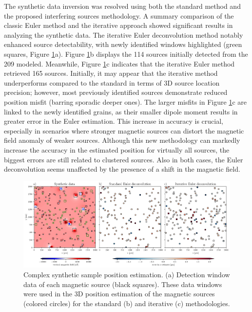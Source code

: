 The synthetic data inversion was resolved using both the standard method \citep{Souza-Junior2024} and the proposed interfering sources methodology. A summary comparison of the classic Euler method and the iterative approach showed significant results in analyzing the synthetic data. The iterative Euler deconvolution method notably enhanced source detectability, with newly identified windows highlighted (green squares, Figure \ref{euler2}a). Figure \ref{euler2}b displays the 114 sources initially detected from the 209 modeled. Meanwhile, Figure \ref{euler2}c indicates that the iterative Euler method retrieved 165 sources. Initially, it may appear that the iterative method underperforms compared to the standard in terms of 3D source location precision; however, most previously identified sources demonstrate reduced position misfit (barring sporadic deeper ones). The larger misfits in Figure \ref{euler2}c are linked to the newly identified grains, as their smaller dipole moment results in greater error in the Euler estimation. This increase in accuracy is crucial, especially in scenarios where stronger magnetic sources can distort the magnetic field anomaly of weaker sources. Although this new methodology can markedly increase the accuracy in the estimated position for virtually all sources, the biggest errors are still related to clustered sources. Also in both cases, the Euler deconvolution seems unaffected by the presence of a shift in the magnetic field.


\begin{figure}[tb!]
  \centering
  \includegraphics[width=1\linewidth]{paper/figures/euler-comparion-synthetic.png}
  \caption{Complex synthetic sample position estimation. (a) Detection window data of each magnetic source (black squares). These data windows were used in the 3D position estimation of the magnetic sources (colored circles) for the standard (b) and iterative (c) methodologies. }
  \label{euler2}
\end{figure}

